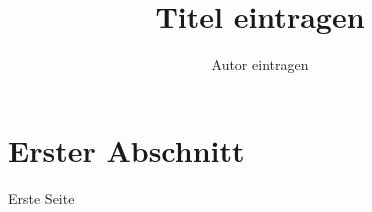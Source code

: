 \documentclass{article}
\author{Autor eintragen}
\title{Titel eintragen}
\date{}
\begin{document}
\maketitle

\section{Erster Abschnitt}

Erste Seite
\end{document}
